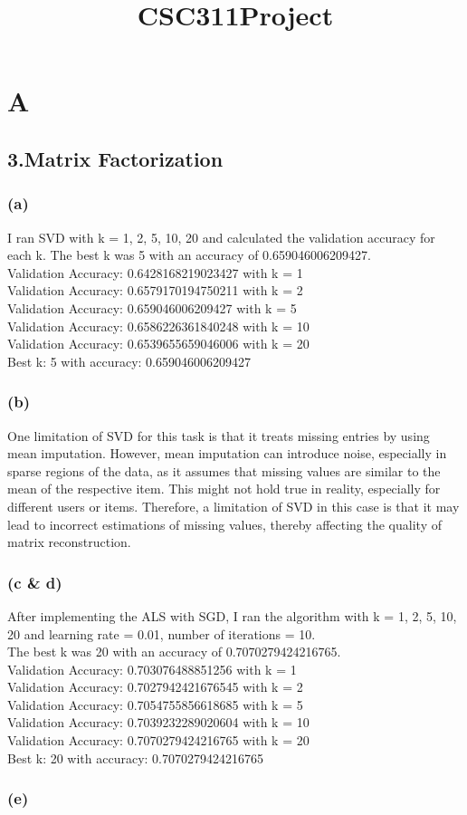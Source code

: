 \documentclass{article}
\title{CSC311Project}
\begin{document}
\maketitle



\section*{A}
\subsection*{3.Matrix Factorization}
\subsubsection*{(a)}
I ran SVD with k = 1, 2, 5, 10, 20 and calculated the validation accuracy for each k. The best k was 5 with an accuracy of 0.659046006209427.\\
Validation Accuracy: 0.6428168219023427 with k = 1\\
Validation Accuracy: 0.6579170194750211 with k = 2\\
Validation Accuracy: 0.659046006209427 with k = 5\\
Validation Accuracy: 0.6586226361840248 with k = 10\\
Validation Accuracy: 0.6539655659046006 with k = 20\\
Best k: 5 with accuracy: 0.659046006209427\\

\subsubsection*{(b)}
One limitation of SVD for this task is that it treats missing entries by using mean imputation. However,
mean imputation can introduce noise, especially in sparse regions of the data, as it assumes that missing values are similar
to the mean of the respective item. This might not hold true in reality, especially for different users or items. Therefore,
a limitation of SVD in this case is that it may lead to incorrect estimations of missing values, thereby affecting the quality
of matrix reconstruction.


\subsubsection*{(c & d)}
After implementing the ALS with SGD, I ran the algorithm with k = 1, 2, 5, 10, 20 and learning rate = 0.01, number of iterations = 10.\\
The best k was 20 with an accuracy of 0.7070279424216765.\\
Validation Accuracy: 0.703076488851256 with k = 1\\
Validation Accuracy: 0.7027942421676545 with k = 2\\
Validation Accuracy: 0.7054755856618685 with k = 5\\
Validation Accuracy: 0.7039232289020604 with k = 10\\
Validation Accuracy: 0.7070279424216765 with k = 20\\
Best k: 20 with accuracy: 0.7070279424216765\\
\subsubsection*{(e)}
\end{document}
